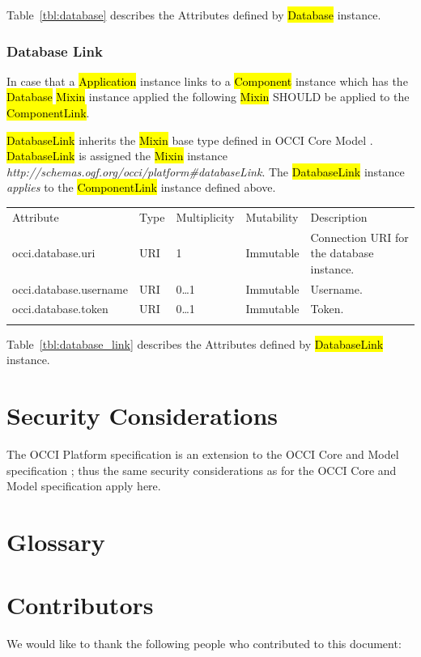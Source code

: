 \documentclass[10pt,a4paper]{article}
\begin{document}
Table~\ref{tbl:database} describes the Attributes defined by \hl{Database} instance.

\subsubsection{Database Link}
In case that a \hl{Application} instance links to a \hl{Component} instance which has the \hl{Database} \hl{Mixin} instance applied the following \hl{Mixin} SHOULD be applied to the \hl{ComponentLink}.

\hl{DatabaseLink} inherits the \hl{Mixin} base type defined in OCCI Core Model \cite{occi:core}. \hl{DatabaseLink} is assigned the \hl{Mixin} instance \textit{http://schemas.ogf.org/occi/platform\#databaseLink}. The \hl{DatabaseLink} instance \textit{applies} to the \hl{ComponentLink} instance defined above.

{
	\begin{tabular}{lp{2.5cm}p{1cm}lp{5cm}}
	\toprule
	Attribute&Type&Multi\-plicity&Mutability&Description\\
	\colrule
	occi.database.uri & URI & 1 & Immutable & Connection URI for the database instance.\\
	occi.database.username & URI & 0\ldots1 & Immutable & Username.\\
	occi.database.token & URI & 0\ldots1 & Immutable & Token.\\
	\botrule
	\end{tabular}
}

Table~\ref{tbl:database_link} describes the Attributes defined by \hl{DatabaseLink} instance.


\section{Security Considerations}
The OCCI Platform specification is an extension to the OCCI Core
and Model specification \cite{occi:core}; thus the same security
considerations as for the OCCI Core and Model specification apply
here.

\section{Glossary}
\label{sec:glossary}


\section{Contributors}
We would like to thank the following people who contributed to this
document:
\end{document}
